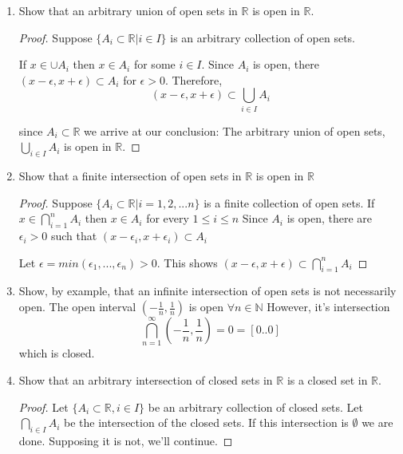 \documentclass{tufte-book}
\theoremstyle{mytheoremstyle}
\theoremstyle{mylemstyle}
\theoremstyle{mydefstyle}
\begin{document}
\begin{enumerate}
\begin{proof}
\end{proof}

\item Show that an arbitrary union of open sets in $\mathbb{R}$ is open in $\mathbb{R}$.

\begin{proof}
Suppose $\{A_i \subset \mathbb{R} | i \in I\}$ is an arbitrary collection of open sets.

If $x \in \cup A_i$ then $x \in A_i$ for some $i \in I$.  Since $A_i$ is open,  there $(x - \epsilon, x+ \epsilon) \subset A_i$ for $\epsilon > 0$.  Therefore,
\[ (x-\epsilon, x+\epsilon) \subset \bigcup\limits_{i \in I}A_i \]

 since $A_i \subset \mathbb{R}$ we arrive at our conclusion: The arbitrary union of open sets, $\bigcup\limits_{i \in I}A_i$ is open in $\mathbb{R}$.
\end{proof}

\item Show that a finite intersection of open sets in $\mathbb{R}$ is open in $\mathbb{R}$
\begin{proof}
Suppose $\{A_i \subset \mathbb{R} | i = 1,2,...n\}$ is a finite collection of open sets.  If $ x \in \bigcap\limits_{i=1}^{n} A_i $ then $x \in A_i$ for every $1 \leq i \leq n$ Since $A_i$ is open, there are $\epsilon_i > 0$  such that $(x - \epsilon_i , x+ \epsilon_i) \subset A_i$

Let $\epsilon = min(\epsilon_1,..., \epsilon_n) > 0$.  This shows $(x - \epsilon, x+ \epsilon) \subset  \bigcap\limits_{i=1}^{n} A_i $

\end{proof}

\item Show, by example, that an infinite intersection of open sets is not necessarily open.
The open interval $(- \frac{1}{n},\frac{1}{n})$ is open $\forall n \in \mathbb{N}$  However, it's intersection
\[ \bigcap\limits_{n=1}^{\infty}(- \frac{1}{n},\frac{1}{n}) = {0} = [0..0] \]
which is closed.

\item Show that an arbitrary intersection of closed sets in $\mathbb{R}$ is a closed set in $\mathbb{R}$.
\begin{proof}

Let $\{A_i \subset \mathbb{R}, i \in I\}$ be an arbitrary collection of closed sets.   Let $\bigcap\limits_{i \in I} A_i$ be the intersection of the closed sets.  If this intersection is $\emptyset$ we are done.  Supposing it is not, we'll continue.


\end{proof}
\end{enumerate}
\end{document}
